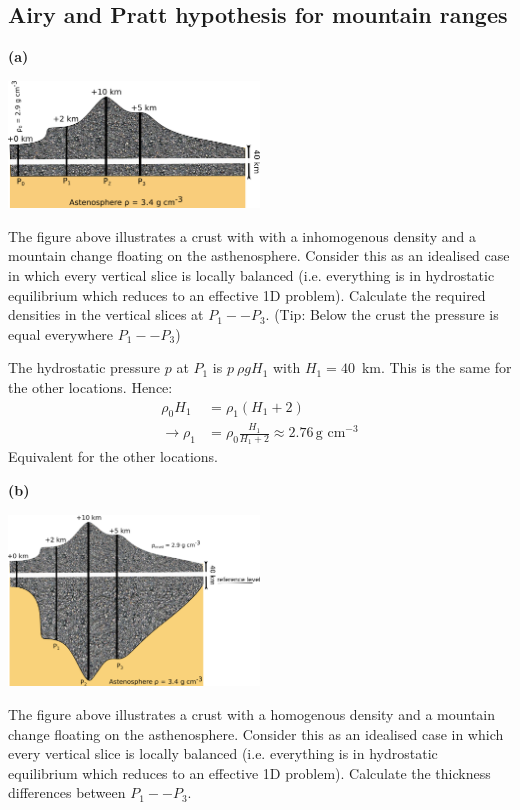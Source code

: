 \subsection{Airy and Pratt hypothesis for mountain ranges}
\textbf{(a)}
\begin{center}
\includegraphics[width=0.5\textwidth]{Figures/Gravimetry/Pratt.png}
\end{center}

The figure above illustrates a crust with  with a inhomogenous density and a mountain change floating on the asthenosphere. Consider this as an idealised case in which every vertical slice is locally balanced (i.e. everything is in hydrostatic equilibrium which reduces to an effective 1D problem). Calculate the required densities in the vertical slices at $P_1 -- P_3$. (Tip: Below the crust the pressure is equal everywhere $P_1 -- P_3$)


\ifanswers
  \begin{tcolorbox}[enhanced jigsaw,breakable,pad at break*=1mm,
    colback=blue!5!white,colframe=babyblueeyes,title=Solutions]
The hydrostatic pressure $p$ at $P_1$ is $p ~ \rho g H_1$ with $H_1=40$~km. This is the same for the other locations. Hence:
\begin{align*}
\rho_0 H_1 &= \rho_1 (H_1 + 2) \\
\rightarrow \rho_1 &= \rho_0 \frac{H_1}{H_1+2} \approx 2.76 \, \text{g cm}^{-3}
\end{align*}
Equivalent for the other locations.
\end{tcolorbox}
\fi
\textbf{(b)}
\begin{center}
  \includegraphics[width=0.5\textwidth]{Figures/Gravimetry/Airy.png}
  \end{center}
The figure above illustrates a crust with a homogenous density and a mountain change floating on the asthenosphere. Consider this as an idealised case in which every vertical slice is locally balanced (i.e. everything is in hydrostatic equilibrium which reduces to an effective 1D problem). Calculate the thickness differences between $P_1 -- P_3$.


